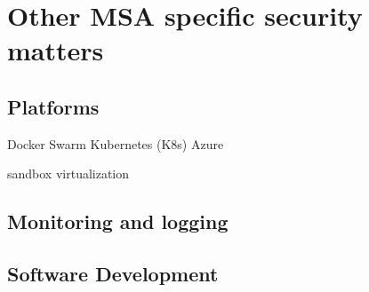 \begin{sloppypar}
\begin{sloppypar}
\end{sloppypar}




\section{Other MSA specific security matters}
\begin{sloppypar}

\end{sloppypar}

\subsection{Platforms}
\begin{sloppypar}
    Docker Swarm
    Kubernetes (K8s)
    Azure
    
    sandbox
    virtualization 
\end{sloppypar}

\subsection{Monitoring and logging}
\begin{sloppypar}

\end{sloppypar}

\subsection{Software Development}
\begin{sloppypar}

\end{sloppypar}


\end{sloppypar}

